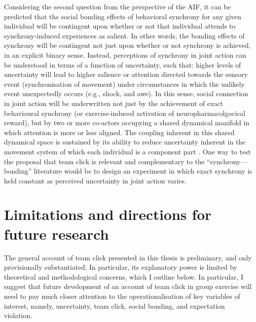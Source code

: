 Considering the second question from the perspective of the AIF,  it can be predicted that the social bonding effects of behavioral synchrony for any given individual will be contingent upon whether or not that individual attends to synchrony-induced experiences as salient.  In other words, the bonding effects of synchrony will be contingent not just upon whether or not synchrony is achieved, in an explicit binary sense.  Instead, perceptions of synchrony in joint action can be understood in terms of a function of uncertainty, such that: higher levels of uncertainty will lead to higher salience or attention directed towards the sensory event (synchronisation of movement) under circumstances in which the unlikely event unexpectedly occurs (e.g., shock, and awe).  In this sense, social connection in joint action will be underwritten not just by the achievement of exact behavioural synchrony (or exercise-induced activation of neuropharmacolgocical reward), but by two or more co-actors occupying a shared dynamical manifold in which attention is more or less aligned. The coupling inherent in this shared dynamical space is sustained by its ability to reduce uncertainty inherent in the movement system of which each individual is a component part \citep{Marsh2009; Riley2011;Fusaroli2014}.  One way to test the proposal that team click is relevant and complementary to the ``synchrony---bonding'' literature would be to design an experiment in which exact synchrony is held constant as perceived uncertainty in joint action varies.



\section{Limitations and directions for future research}
The general account of team click presented in this thesis is preliminary, and only provisionally substantiated. In particular, its explanatory power is limited by theoretical and methodological concerns, which I outline below.  In particular, I suggest that future development of an account of team click in group exercise will need to pay much closer attention to the operationalisation of key variables of interest, namely, uncertainty, team click, social bonding, and expectation violation.

